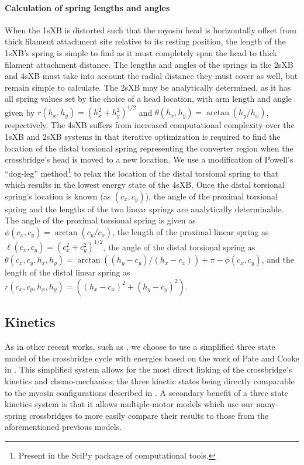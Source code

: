 \documentclass[]{article}
\begin{document}
\paragraph{Calculation of spring lengths and angles} %
When the 1sXB is distorted such that the myosin head is horizontally offset from thick filament attachment site relative to its resting position, the length of the 1sXB's spring is simple to find as it must completely span the head to thick filament attachment distance.
The lengths and angles of the springs in the 2sXB and 4sXB must take into account the radial distance they must cover as well, but remain simple to calculate.
The 2sXB may be analytically determined, as it has all spring values set by the choice of a head location, with arm length and angle given by $r(h_x, h_y)=(h_x^2 + h_y^2)^{1/2}$ and $\theta(h_x, h_y)=\arctan(h_y/h_x)$, respectively.
The 4sXB suffers from increased computational complexity over the 1sXB and 2sXB systems in that iterative optimization is required to find the location of the distal torsional spring representing the converter region when the crossbridge's head is moved to a new location.
We use a modification of Powell's ``dog-leg'' method\footnote{Present in the SciPy package of computational tools.} to relax the location of the distal torsional spring to that which results in the lowest energy state of the 4sXB.
Once the distal torsional spring's location is known (as $(c_x, c_y)$), the angle of the proximal torsional spring and the lengths of the two linear springs are analytically determinable.
The angle of the proximal torsional spring is given as $\phi(c_x, c_y)=\arctan(c_y/c_x)$, the length of the proximal linear spring as $\ell(c_x, c_y)=(c_x^2 + c_y^2)^{1/2}$, the angle of the distal torsional spring as $\theta(c_x, c_y, h_x, h_y) = \arctan((h_y-c_y)/(h_x-c_x)) + \pi - \phi(c_x, c_y)$, and the length of the distal linear spring as $r(c_x, c_y, h_x, h_y)=((h_x-c_x)^2 + (h_y-c_y)^2)$.

\subsection*{Kinetics} %
As in other recent works, such as \citet{Tanner:2007:pe115}, we choose to use a simplified three state model of the crossbridge cycle with energies based on the work of Pate and Cooke in \citet{Pate:1989:p181}. 
This simplified system allows for the most direct linking of the crossbridge's kinetics and chemo-mechanics; the three kinetic states being directly comparable to the myosin configurations described in \citet{Houdusse:2000:p11238}.
A secondary benefit of a three state kinetics system is that it allows multiple-motor models which use our many-spring crossbridges to more easily compare their results to those from the aforementioned previous models.
\end{document}
